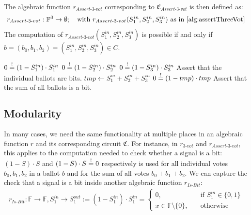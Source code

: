 The algebraic function $r_{Assert\text{-}3\text{-}vot}$ corresponding to $\mathfrak{C}_{Assert\text{-}3\text{-}vot}$ is then defined as:
\begin{align*}
    r_{Assert\text{-}3\text{-}vot}:\mathbb{F}^3\to\emptyset; \quad\text{with } r_{Assert\text{-}3\text{-}vot}(S_1^{in}, S_2^{in}, S_3^{in}) \text{ as in \cref{alg:assertThreeVot}}
\end{align*}
The computation of $r_{Assert\text{-}3\text{-}vot}(S_1^{in}, S_2^{in}, S_3^{in})$ is possible if and only if $b=(b_0, b_1, b_2)=(S_1^{in}, S_2^{in}, S_3^{in})\in C$.

\begin{Algorithmus}[h] %
    \caption{Function $r_{Assert\text{-}3\text{-}vot}$ used to assert that a ballot $b=(b_0,b_1,b_2)=(S_1^{in}, S_2^{in}, S_3^{in})$ is in the choice space $C=\{(0,0,0),(1,0,0),(0,1,0),(0,0,1)\}$. 
    $r_{Assert\text{-}3\text{-}vot}$ returns nothing if this is the case. Otherwise, the computation of $r_{Assert\text{-}3\text{-}vot}$ results in an error.}
    \label{alg:assertThreeVot}
    \begin{algorithmic}
        \State $0\overset{!}{=} (1-S_1^{in})\cdot S_1^{in}$
        \State $0\overset{!}{=} (1-S_2^{in})\cdot S_2^{in}$
        \State $0\overset{!}{=} (1-S_3^{in})\cdot S_3^{in}$ \Comment Assert that the individual ballots are bits.
        \State $tmp \gets  S_1^{in}+S_2^{in}+S_3^{in}$
        \State $0\overset{!}{=} (1-tmp)\cdot tmp$ \Comment Assert that the sum of all ballots is a bit.
    \EndProcedure
    \end{algorithmic}
\end{Algorithmus}

\newpage
\subsection{Modularity}

In many cases, we need the same functionality at multiple places in an algebraic function $r$ and its corresponding circuit $\mathfrak{C}$.
For instance, in $r_{3\text{-}vot}$ and $r_{Assert\text{-}3\text{-}vot}$, this applies to the computation needed to check whether a signal is a bit:
$(1-S)\cdot S$ and $(1-S)\cdot S\overset{!}{=} 0$ respectively is used for all individual votes $b_0,b_1,b_2$ in a ballot $b$ and for the sum of all votes $b_0+b_1+b_2$.
We can capture the check that a signal is a bit inside another algebraic function $r_{Is\text{-}Bit}$:
\begin{align*}
    r_{Is\text{-}Bit}:\mathbb{F}\to\mathbb{F}, S_1^{in}\to S_1^{out}:=(1-S_1^{in})\cdot S_1^{in}=\begin{cases}
        0,&\quad\text{if } S_1^{in}\in\{0,1\}\\
        x\in\mathbb{F}\setminus\{0\},&\quad\text{otherwise}
    \end{cases}
\end{align*}

